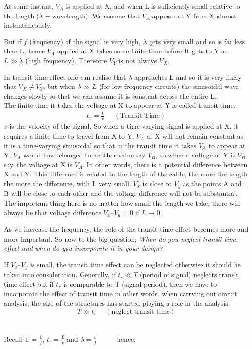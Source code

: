 At some instant, $ V_{A} $ is applied at X, and when L is sufficiently small relative to the length ($  \lambda = \text{wavelength} $). We assume that $ V_{A} $ appears at Y from X almost instantaneously.

But if $f$ (frequency) of the signal is very high, $\lambda $ gets very small and so is far less than L, hence  $  V_{A} $ applied at X takes some finite time before It gets to Y as $  L\gg \lambda $ (high frequency). Therefore $  V_{Y} $ is not always $  V_{X} $.

In transit time effect one can realise that $ \lambda $  approaches L and so it is very likely that $ V_{X} \neq V_{Y} $, but when $  \lambda \gg L  $ (for low-frequency circuits) the sinusoidal wave changes slowly so that we can assume it is constant across the entire L.\\
The finite time it takes the voltage at X to appear at Y is called transit time.
\begin{align}
 t_{r} = \frac{L}{v}\ \ \ \ \ \ (\text{Transit  Time})
\end{align}
$v$ is the velocity of the signal. So when a time-varying signal is applied at X, it requires a finite time to travel from X to Y.  $ V_{A} $  at X will not remain constant as it is a time-varying sinusoidal so that in the transit time it takes $ V_{A} $ to appear at Y, $ V_{A} $ would have changed to another value say $ V_{B} $, so when a voltage at Y is $ V_{B} $ say, the voltage at X is $ V_{A} $. In other words, there is a potential difference between X and Y. This difference is related to the length of the cable, the more the length the more the difference, with L very small. $ V_{x} $ is close to $ V_{y} $ as the points A and B will be close to each other and the voltage difference will not be substantial. The important thing here is no matter how small the length we take, there will always be that voltage difference $ V_{x} – V_{y} = 0 $ if $ L \rightarrow 0 $.

As we increase the frequency, the role of the transit time effect becomes more and more important. So now to the big question; \textit{When do you neglect transit time effect and when do you incorporate it in your design?}

If $ V_{x} – V_{y} $ is small, the transit time effect can be neglected otherwise it should be taken into consideration. Generally, if  $ t_{r} \ll T $ (period of signal) neglects transit time effect but if $ t_{r} $ is comparable to T (signal period), then we have to incorporate the effect of transit time in other words, when carrying out circuit analysis, the size of the structures has started playing a role in the analysis.
$$ T \gg t_{r}\ \ \ \ \ \ (\text{neglect transit time})$$\\\\
 Recall T = $   \frac{1}{f}  $, $ t_{r} = \frac{L}{v} $ and $ \lambda = \frac{v}{f} $\ \ \ \ \ \ hence; 

